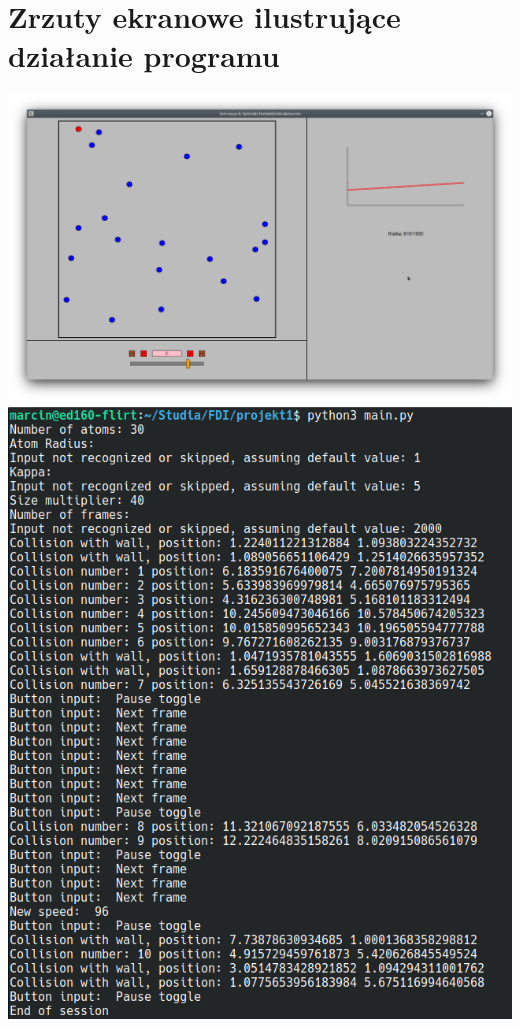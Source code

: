 \documentclass{article}
\begin{document}
\section{Zrzuty ekranowe ilustrujące działanie programu}
    \includegraphics[width=\textwidth]{Screenshot 1.png}\\
    
    \includegraphics[width=\textwidth]{Screenshot 2a.png}\\
\end{document}
